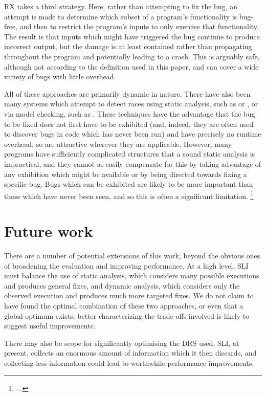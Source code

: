 \documentclass[10pt,twocolumn,preprint,natbib,authoryear]{sigplanconf}
\newcommand{\editorial}[1]{\textcolor{red}{\footnote{\textcolor{red}{#1}}}}
\begin{document}
RX\cite{Qin2007} takes a third strategy.  Here, rather than
attempting to fix the bug, an attempt is made to determine which
subset of a program's functionality is bug-free, and then to restrict
the program's inputs to only exercise that functionality.  The result
is that inputs which might have triggered the bug continue to produce
incorrect output, but the damage is at least contained rather than
propagating throughout the program and potentially leading to a crash.
This is arguably safe, although not according to the definition used
in this paper, and can cover a wide variety of bugs with little
overhead.

All of these approaches are primarily dynamic in nature.  There have
also been many systems which attempt to detect races using static
analysis, such as \cite{Pratikakis2006} or \cite{Engler2003}, or via
model checking, such as \cite{Elmas06preciserace}.  These techniques
have the advantage that the bug to be fixed does not first have to be
exhibited (and, indeed, they are often used to discover bugs in code
which has never been run) and have precisely no runtime overhead, so
are attractive wherever they are applicable.  However, many programs
have sufficiently complicated structures that a sound static analysis
is impractical, and they cannot as easily compensate for this by
taking advantage of any exhibition which might be available or by
being directed towards fixing a specific bug.  Bugs which can be
exhibited are likely to be more important than those which have never
been seen, and so this is often a significant
limitation. \editorial{...}

\section{Future work}

There are a number of potential extensions of this work, beyond the
obvious ones of broadening the evaluation and improving performance.
At a high level, SLI must balance the use of static analysis, which
considers many possible executions and produces general fixes, and
dynamic analysis, which considers only the observed execution and
produces much more targeted fixes.  We do not claim to have found the
optimal combination of these two approaches, or even that a global
optimum exists; better characterizing the trade-offs involved is
likely to suggest useful improvements.

There may also be scope for significantly optimising the DRS used.
SLI, at present, collects an enormous amount of information which it
then discards, and collecting less information could lead to
worthwhile performance improvements.
\end{document}
